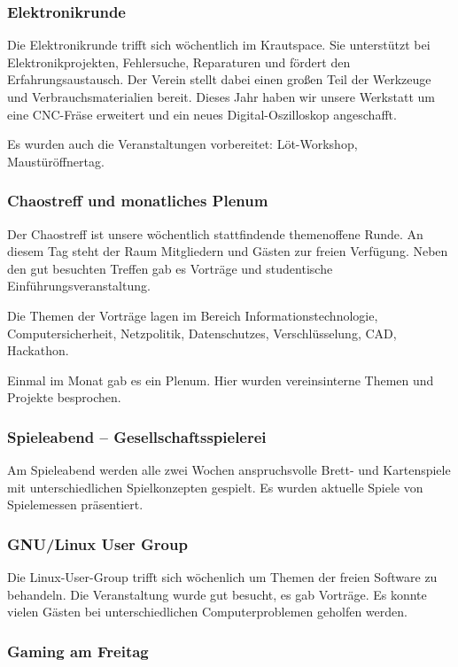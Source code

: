 \documentclass[ngerman]{scrartcl}
\begin{document}
\subsubsection{Elektronikrunde}

Die Elektronikrunde trifft sich wöchentlich im Krautspace.
Sie unterstützt bei Elektronikprojekten, Fehlersuche,
Reparaturen und fördert den Erfahrungsaustausch.
Der Verein stellt dabei einen großen Teil der Werkzeuge und
Verbrauchsmaterialien bereit.
Dieses Jahr haben wir unsere Werkstatt um eine CNC-Fräse erweitert und
ein neues Digital-Oszilloskop angeschafft.

Es wurden auch die Veranstaltungen vorbereitet: Löt-Workshop, Maustüröffnertag.

\subsubsection{Chaostreff und monatliches Plenum}

Der Chaostreff ist unsere wöchentlich stattfindende themenoffene Runde.
An diesem Tag steht der Raum Mitgliedern und Gästen zur freien Verfügung.
Neben den gut besuchten Treffen gab es Vorträge und studentische 
Einführungsveranstaltung.

Die Themen der Vorträge lagen im Bereich Informationstechnologie, 
Computersicherheit, Netzpolitik, Datenschutzes, Verschlüsselung, CAD,
Hackathon.

Einmal im Monat gab es ein Plenum. Hier wurden vereinsinterne Themen und Projekte besprochen.

\subsubsection{Spieleabend -- Gesellschaftsspielerei}

Am Spieleabend werden alle zwei Wochen anspruchsvolle Brett- und
Kartenspiele mit unterschiedlichen Spielkonzepten gespielt.
Es wurden aktuelle Spiele von Spielemessen präsentiert.

\subsubsection{GNU/Linux User Group}

Die Linux-User-Group trifft sich wöchenlich um Themen der freien Software
zu behandeln. Die Veranstaltung wurde gut besucht, es gab Vorträge. Es
konnte vielen Gästen bei unterschiedlichen Computerproblemen geholfen werden.

\subsubsection{Gaming am Freitag}
\end{document}
